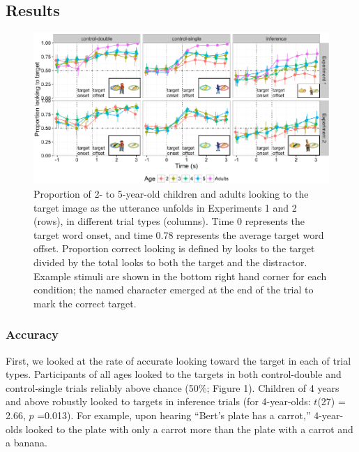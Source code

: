 \documentclass[a4paper,man,apacite,floatsintext]{apa6}
\newenvironment{CodeChunk}{}{}
\begin{document}
\subsection{Results}\label{results}

\begin{CodeChunk}
\begin{figure}[H]

{\centering \includegraphics{figs/et_acc-1} 

}

\caption[Proportion of 2- to 5-year-old children and adults looking to the target image as the utterance unfolds in Experiments 1 and 2 (rows), in different trial types (columns)]{Proportion of 2- to 5-year-old children and adults looking to the target image as the utterance unfolds in Experiments 1 and 2 (rows), in different trial types (columns). Time 0 represents the target word onset, and time 0.78 represents the average target word offset. Proportion correct looking is defined by looks to the target divided by the total looks to both the target and the distractor. Example stimuli are shown in the bottom right hand corner for each condition; the named character emerged at the end of the trial to mark the correct target.}\label{fig:et_acc}
\end{figure}
\end{CodeChunk}

\subsubsection{Accuracy}\label{accuracy}

First, we looked at the rate of accurate looking toward the target in
each of trial types. Participants of all ages looked to the targets in
both control-double and control-single trials reliably above chance
(50\%; Figure 1). Children of 4 years and above robustly looked to
targets in inference trials (for 4-year-olds: \(t\)(27) = 2.66, \(p\)
=0.013). For example, upon hearing ``Bert's plate has a carrot,''
4-year-olds looked to the plate with only a carrot more than the plate
with a carrot and a banana.
\end{document}
